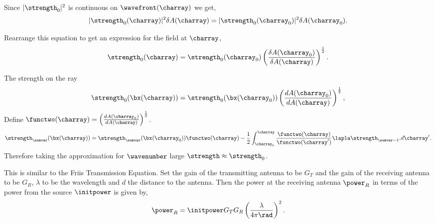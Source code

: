 \documentclass[8pt]{beamer}
\begin{document}
\begin{frame}
\begin{block}{}
\par Since $|\strength_0|^2 $ is continuous on $\wavefront(\charray)$ we get,
\begin{equation}
|\strength_0(\charray) |^2 \delta A (\charray)=|\strength_0(\charray_0) |^2 \delta A (\charray_0).
\end{equation}
\par Rearrange this equation to get an expression for the field at $\charray$,
\begin{equation}
\strength_0(\charray)  =\strength_0(\charray_0)  \left(\frac{\delta A (\charray_0)}{\delta A (\charray)}\right)^{\frac{1}{2}}.\label{eqn::fieldzerofirst}
\end{equation}
\end{block}
\end{frame}
\begin{frame}
\begin{block}{The strength on the ray}
\begin{equation}
\strength_0 (\bx(\charray))= \strength_0 (\bx(\charray_0))\left(\frac{dA(\charray_0)}{dA(\charray)}\right)^{\frac{1}{2}}, \label{eqn::strengthzero}
\end{equation}
Define $\functwo(\charray)=\left(\frac{dA(\charray_0)}{dA(\charray)}\right)^{\frac{1}{2}}$. 
\begin{equation}
\strength_\sumvar (\bx(\charray))= \strength_\sumvar (\bx(\charray_0))\functwo(\charray)-\frac{1}{2} \int_{\charray_0}^\charray \frac{\functwo(\charray)}{ \functwo(\charray')}\lapla \strength_{\sumvar-1}. d \charray'.
\end{equation}
Therefore taking the approximation for $\wavenumber$ large $\strength \approx \strength _0$. 
\par This is similar to the Friis Transmission Equation. Set the gain of the transmitting antenna to be $G_T$ and the gain of the receiving antenna to be $G_R$, $\lambda$ to be the wavelength and $d$ the distance to the antenna. Then the power at the receiving antenna $\power_R$ in terms of the power from the source $\initpower$ is given by,
\begin{equation}
\power_R=\initpower G_T G_R \left( \frac{\lambda}{4 \pi  \rad}\right)^2.
\end{equation}
\end{block}
\end{frame}
\end{document}
